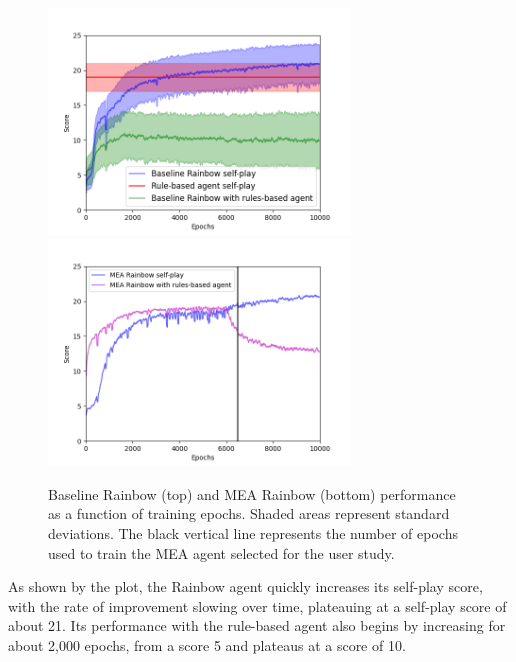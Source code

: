 \documentclass[letterpaper]{article} %
\begin{document}
\begin{figure}[t]
    \centering
    \includegraphics[width=8cm]{baseline.png}
    \includegraphics[width=8cm]{mixed.png}
    \caption{Baseline Rainbow (top) and MEA  Rainbow (bottom)   performance as a function of training   epochs. Shaded areas represent standard deviations. The black vertical line represents the number of epochs used to train the MEA agent selected for the user study.
    }
    \label{fig:performance}
\end{figure}

As shown by the plot, the Rainbow agent quickly increases its self-play score, with the rate of improvement slowing over time, plateauing at a self-play score of about 21. Its performance  with the rule-based agent also begins by increasing for about 2,000 epochs,   from a score 5   and plateaus at a score of 10. 
\end{document}
